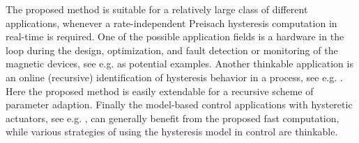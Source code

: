\documentclass[journal]{IEEEtran}
\begin{document}
The proposed method is suitable for a relatively large class of
different applications, whenever a rate-independent Preisach
hysteresis computation in real-time is required. One of the
possible application fields is a hardware in the loop during the
design, optimization, and fault detection or monitoring of the
magnetic devices, see e.g. \cite{RosenEtAl10,ruderman2013b} as
potential examples. Another thinkable application is an online
(recursive) identification of hysteresis behavior in a process,
see e.g. \cite{ruder2015}. Here the proposed method is easily
extendable for a recursive scheme of parameter adaption. Finally
the model-based control applications with hysteretic actuators,
see e.g.
\cite{davino2005,Janocha2008,iyer2009,esbrook2013,ruderman2014},
can generally benefit from the proposed fast computation, while
various strategies of using the hysteresis model in control are
thinkable.





\ifCLASSOPTIONcaptionsoff
  \newpage
\fi


















\end{document}
